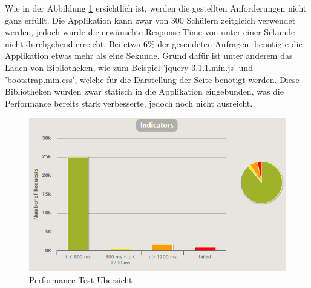 Wie in der Abbildung \ref{performance_tests} ersichtlich ist, werden die gestellten Anforderungen nicht ganz erfüllt. Die Applikation kann zwar von 300 Schülern zeitgleich verwendet werden, jedoch wurde die erwünschte Response Time von unter einer Sekunde nicht durchgehend erreicht. Bei etwa 6\% der gesendeten Anfragen, benötigte die Applikation etwas mehr als eine Sekunde. Grund dafür ist unter anderem das Laden von Bibliotheken, wie zum Beispiel 'jquery-3.1.1.min.js' und 'bootstrap.min.css', welche für die Darstellung der Seite benötigt werden. Diese Bibliotheken wurden zwar statisch in die Applikation eingebunden, was die Performance bereits stark verbesserte, jedoch noch nicht ausreicht. 

	\begin{figure}[H]
		\includegraphics[width=\textwidth, height=\textheight, keepaspectratio]{images/performance_uebersicht.png}
		\caption{Performance Test Übersicht}
			\label{performance_tests}
	\end{figure}


